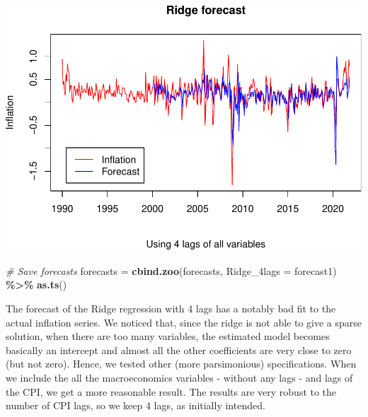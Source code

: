 \documentclass[
]{article}
\newenvironment{Shaded}{\begin{snugshade}}{\end{snugshade}}
\newcommand{\AttributeTok}[1]{\textcolor[rgb]{0.13,0.29,0.53}{#1}}
\newcommand{\CommentTok}[1]{\textcolor[rgb]{0.56,0.35,0.01}{\textit{#1}}}
\newcommand{\FunctionTok}[1]{\textcolor[rgb]{0.13,0.29,0.53}{\textbf{#1}}}
\newcommand{\NormalTok}[1]{#1}
\newcommand{\OtherTok}[1]{\textcolor[rgb]{0.56,0.35,0.01}{#1}}
\newcommand{\SpecialCharTok}[1]{\textcolor[rgb]{0.81,0.36,0.00}{\textbf{#1}}}
\begin{document}
\includegraphics{Trabalho_Econo4_Q2_files/figure-latex/unnamed-chunk-19-1.pdf}

\begin{Shaded}
\begin{Highlighting}[]
\CommentTok{\# Save forecasts}
\NormalTok{forecasts }\OtherTok{=} \FunctionTok{cbind.zoo}\NormalTok{(forecasts, }\AttributeTok{Ridge\_4lags =}\NormalTok{ forecast1) }\SpecialCharTok{\%\textgreater{}\%}
    \FunctionTok{as.ts}\NormalTok{()}
\end{Highlighting}
\end{Shaded}

The forecast of the Ridge regression with 4 lags has a notably bad fit
to the actual inflation series. We noticed that, since the ridge is not
able to give a sparse solution, when there are too many variables, the
estimated model becomes basically an intercept and almost all the other
coefficients are very close to zero (but not zero). Hence, we tested
other (more parsimonious) specifications. When we include the all the
macroeconomics variables - without any lags - and lags of the CPI, we
get a more reasonable result. The results are very robust to the number
of CPI lags, so we keep 4 lags, as initially intended.
\end{document}
